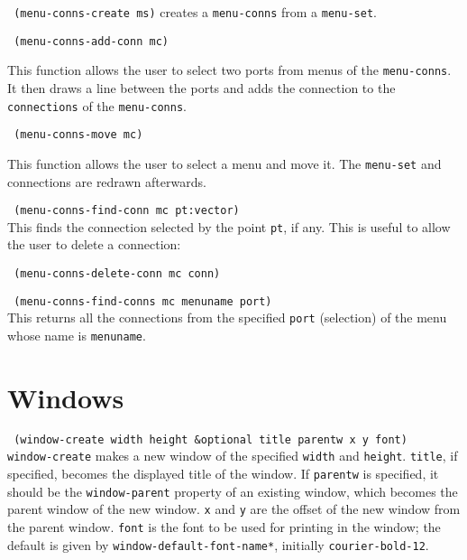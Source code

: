 {\tt \hspace*{0.5in} (menu-conns-create ms)} creates a {\tt menu-conns}
from a {\tt menu-set}.

{\tt \hspace*{0.5in} (menu-conns-add-conn mc)}

This function allows the user to select two ports from menus of the
{\tt menu-conns}.  It then draws a line between the ports and adds the
connection to the {\tt connections} of the {\tt menu-conns}.

{\tt \hspace*{0.5in} (menu-conns-move mc)}

This function allows the user to select a menu and move it.
The {\tt menu-set} and connections are redrawn afterwards.

{\tt \hspace*{0.5in} (menu-conns-find-conn mc pt:vector)} \\
This finds the connection selected by the point {\tt pt}, if any.
This is useful to allow the user to delete a connection:

{\tt \hspace*{0.5in} (menu-conns-delete-conn mc conn)}

{\tt \hspace*{0.5in} (menu-conns-find-conns mc menuname port)} \\
This returns all the connections from the specified {\tt port} (selection)
of the menu whose name is {\tt menuname}.


\section{Windows}

{\tt \hspace*{0.5in} (window-create width height \&optional title parentw
 x y font)} \\

\vspace{-0.1in}
{\tt window-create} makes a new window of the specified {\tt width} and
{\tt height}.  {\tt title}, if specified, becomes the displayed title
of the window.  If {\tt parentw} is specified, it should be the
{\tt window-parent} property of an existing window, which becomes the parent
window of the new window.  {\tt x} and {\tt y} are the offset of the
new window from the parent window.  {\tt font} is the font to be used
for printing in the window; the default is given by
{\tt *window-default-font-name*}, initially {\tt courier-bold-12}.

